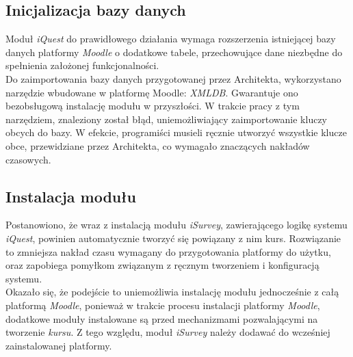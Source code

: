 \subsection{Inicjalizacja bazy danych}
\label{Chapter623}

Moduł \textit{iQuest} do prawidłowego działania wymaga rozszerzenia istniejącej bazy danych platformy \textit{Moodle} o dodatkowe tabele, przechowujące dane niezbędne do spełnienia założonej funkcjonalności. \\

Do zaimportowania bazy danych przygotowanej przez Architekta, wykorzystano narzędzie wbudowane w platformę Moodle: \textit{XMLDB}. Gwarantuje ono bezobsługową instalację modułu w przyszłości. W trakcie pracy z tym narzędziem, znaleziony został błąd, uniemożliwiający zaimportowanie kluczy obcych do bazy. W efekcie, programiści musieli ręcznie utworzyć wszystkie klucze obce, przewidziane przez Architekta, co wymagało znaczących nakładów czasowych.

\subsection{Instalacja modułu}
\label{Chapter624}
Postanowiono, że wraz z instalacją modułu \textit{iSurvey}, zawierającego logikę systemu \textit{iQuest}, powinien automatycznie tworzyć się powiązany z nim kurs. Rozwiązanie to zmniejsza nakład czasu wymagany do przygotowania platformy do użytku, oraz zapobiega pomyłkom związanym z ręcznym tworzeniem i konfiguracją systemu. \\

Okazało się, że podejście to uniemożliwia instalację modułu jednocześnie z całą platformą \textit{Moodle}, ponieważ w trakcie procesu instalacji platformy \textit{Moodle}, dodatkowe moduły instalowane są przed mechanizmami pozwalającymi na tworzenie \textit{kursu}. Z tego względu, moduł \textit{iSurvey} należy dodawać do wcześniej zainstalowanej platformy.